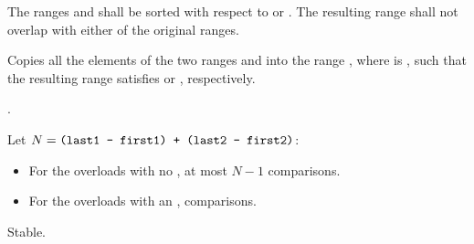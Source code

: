 \begin{itemdescr}
\pnum
\requires The ranges  and  shall be
sorted with respect to  or .
The resulting range shall not overlap with either of the original ranges.

\pnum
\effects Copies all the elements of the two ranges  and
 into the range , where 
is , such that the resulting range satisfies
 or , respectively.

\pnum
\returns
{}.

\pnum
\complexity Let $N = \texttt{(last1 - first1) + (last2 - first2)}$:
\begin{itemize}
\item For the overloads with no , at most $N - 1$ comparisons.
\item For the overloads with an ,  comparisons.
\end{itemize}

\pnum
\remarks Stable.
\end{itemdescr}

